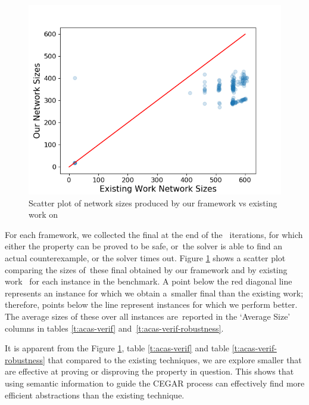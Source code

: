\begin{figure}
    \vspace*{-0.5cm}
    \includegraphics[scale=0.4]{figs/scatter-cegar-our-nerualsat-diag-new.png}
    \vspace{0.15cm}
    \caption{Scatter plot of network sizes produced by our framework vs existing
    work \cite{cegar-nn} on \acasxu }
    \label{f:scatter-netsizes}
    \vspace*{-0.5cm}
\end{figure}

For each framework, we collected the final \abs at the end of the \cegar iterations, for which either the property can be proved to be safe, or the solver is able to find an actual counterexample, or the solver times out. Figure \ref{f:scatter-netsizes} shows a scatter plot comparing the sizes of these final \abs obtained by our framework and by existing work \cite{cegar-nn} for each instance in the benchmark.
A point below the red diagonal line represents an instance for which we obtain a smaller final \abs than the existing work; therefore, points below the line represent instances for which we perform better.
The average sizes of these \abs over all instances are reported in the `Average Size' columns in tables \ref{t:acas-verif} and \ref{t:acas-verif-robustness}.

It is apparent from the Figure \ref{f:scatter-netsizes}, 
table \ref{t:acas-verif} and table \ref{t:acas-verif-robustness} that compared 
to the existing techniques, we are explore smaller \abs that are effective 
at proving or disproving the property in question.
This shows that using semantic information to guide the CEGAR process can
effectively find more efficient abstractions than the existing technique.

